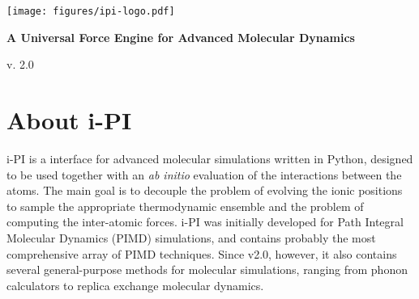 \documentclass[11pt,english,fleqn]{report}
\begin{document}
\newcommand{\dd}{\; \mathrm{d}} 
\newcommand{\Tr}{\mathrm{Tr}} 
\newcommand{\bra}{< \! \!} 
\newcommand{\ket}{\! \! >} 
\newcommand{\betan}{\beta_N} 
\newcommand{\logn}{\mathrm{ln}} 
\newcommand{\expon}{\mathrm{exp}} 
\newcommand{\Imag}{\mathrm{Im}}
\newcommand{\ipi}{{i-PI}\xspace}
\newcommand{\DFT}{Quantum Espresso, CP2K, CPMD and FHI-AIMS }
\newcommand{\empirical}{LAMMPS}

\begin{titlepage} 

\begin{center}
\vspace*{2.5cm}

\par\end{center}

\begin{center}
\texttt{[image: figures/ipi-logo.pdf]}
\par\end{center}

\begin{center}
{\Large\bf A Universal Force Engine for Advanced Molecular Dynamics}
\par\end{center}

\begin{center}
{\large v. 2.0}
\par\end{center}

\end{titlepage}


\tableofcontents{}


\newpage{}


\chapter{About \ipi}

\label{intro}

\ipi is a interface for advanced molecular simulations written
in Python, designed to be used together with an \emph{ab initio} evaluation
of the interactions between the atoms. The main goal is to decouple
the problem of evolving the ionic positions to sample the appropriate
thermodynamic ensemble and the problem of computing the inter-atomic
forces. \ipi was initially developed for Path Integral Molecular Dynamics (PIMD)
simulations, and contains probably the most comprehensive array of PIMD
techniques. Since v2.0, however, it also contains several general-purpose 
methods for molecular simulations, ranging from phonon calculators to 
replica exchange molecular dynamics.
\end{document}
